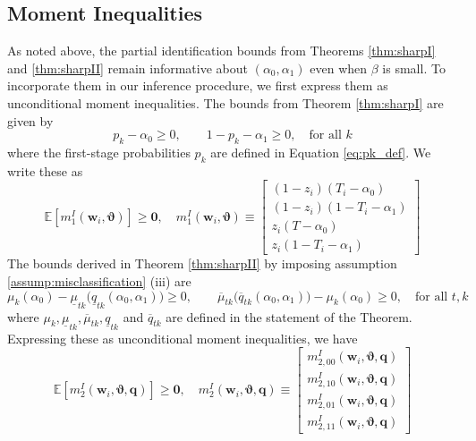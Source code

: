 \subsection{Moment Inequalities} 
\label{sec:inequalities}
As noted above, the partial identification bounds from Theorems \ref{thm:sharpI} and \ref{thm:sharpII} remain informative about $(\alpha_0, \alpha_1)$ even when $\beta$ is small.
To incorporate them in our inference procedure, we first express them as unconditional moment inequalities.
The bounds from Theorem \ref{thm:sharpI} are given by
\begin{equation*}
  p_k - \alpha_0 \geq 0, \quad \quad 1 - p_k - \alpha_1 \geq 0, \quad \mbox{for all } k 
\end{equation*}
where the first-stage probabilities $p_k$ are defined in Equation \ref{eq:pk_def}.
We write these as 
\begin{equation}
  \mathbb{E}\left[ m_1^I(\mathbf{w}_i,\boldsymbol{\vartheta} ) \right] \geq \mathbf{0},  \quad
m_1^I(\mathbf{w}_i, \boldsymbol{\vartheta}) \equiv \left[
  \begin{array}{l}
    (1 - z_i)(T_i - \alpha_0) \\
    (1 - z_i)(1 - T_i - \alpha_1) \\
    z_i(T - \alpha_0) \\
    z_i (1 - T_i - \alpha_1) 
  \end{array}
\right]
\label{eq:m1I}
\end{equation}
The bounds derived in Theorem \ref{thm:sharpII} by imposing assumption \ref{assump:misclassification} (iii) are
\begin{equation*}
  \mu_k(\alpha_0) - \underline{\mu}_{tk}\big( \underline{q}_{tk}(\alpha_0, \alpha_1) \big) \geq 0, \quad \quad
  \overline{\mu}_{tk}\big( \overline{q}_{tk}(\alpha_0, \alpha_1) \big) - \mu_k(\alpha_0) \geq 0, \quad \mbox{for all } t,k
\end{equation*}
where $\mu_k, \underline{\mu}_{tk}, \overline{\mu}_{tk}, \underline{q}_{tk}$ and $\overline{q}_{tk}$ are defined in the statement of the Theorem.
Expressing these as unconditional moment inequalities, we have
\begin{equation}
  \mathbb{E}[m_2^I(\mathbf{w}_i,\boldsymbol{\vartheta}, \mathbf{q})] \geq \mathbf{0}, \quad 
  m_2^I(\mathbf{w}_i,\boldsymbol{\vartheta}, \mathbf{q}) \equiv \left[
  \begin{array}{c}
    m_{2,00}^I(\mathbf{w}_i,\boldsymbol{\vartheta}, \mathbf{q})  \\ 
    m_{2,10}^I(\mathbf{w}_i,\boldsymbol{\vartheta}, \mathbf{q}) \\
    m_{2,01}^I(\mathbf{w}_i,\boldsymbol{\vartheta}, \mathbf{q})  \\ 
    m_{2,11}^I(\mathbf{w}_i,\boldsymbol{\vartheta}, \mathbf{q}) 
  \end{array}
  \label{eq:m2I}
\right] 
\end{equation}
